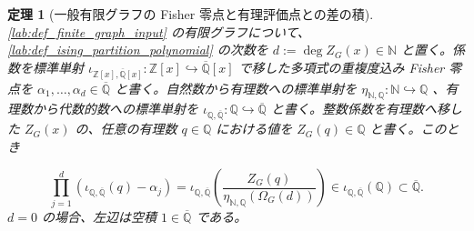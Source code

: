 \documentclass[11pt,a4paper]{article}
\newtheorem{theorem}[definition]{定理}
\theoremstyle{remark}
\begin{document}
\begin{theorem}[一般有限グラフの Fisher 零点と有理評価点との差の積]\label{lab:theorem_fisher_zero_rational_shifted_product_coefficient_ratio}
\cref{lab:def_finite_graph_input}
 の有限グラフについて、
\cref{lab:def_ising_partition_polynomial}
 の次数を
$d:=\deg Z_G(x)\in\mathbb N$
 と置く。係数を標準単射
$\iota_{\mathbb Z[x],\overline{\mathbb Q}[x]}:\mathbb Z[x]\hookrightarrow\overline{\mathbb Q}[x]$
 で移した多項式の重複度込み Fisher 零点を
$\alpha_1,\ldots,\alpha_d\in\overline{\mathbb Q}$
 と書く。自然数から有理数への標準単射を
$\eta_{\mathbb N,\mathbb Q}:\mathbb N\hookrightarrow\mathbb Q$
、有理数から代数的数への標準単射を
$\iota_{\mathbb Q,\overline{\mathbb Q}}:\mathbb Q\hookrightarrow\overline{\mathbb Q}$
 と書く。整数係数を有理数へ移した
$Z_G(x)$
 の、任意の有理数
$q\in\mathbb Q$
 における値を
$Z_G(q)\in\mathbb Q$
 と書く。このとき

\[\prod_{j=1}^{d}\left(\iota_{\mathbb Q,\overline{\mathbb Q}}(q)-\alpha_j\right)
=
\iota_{\mathbb Q,\overline{\mathbb Q}}\!\left(
  \frac{
    Z_G(q)
  }{
    \eta_{\mathbb N,\mathbb Q}(\Omega_G(d))
  }
\right)
\in\iota_{\mathbb Q,\overline{\mathbb Q}}(\mathbb Q)
\subset\overline{\mathbb Q}.\]
$d=0$
 の場合、左辺は空積
$1\in\overline{\mathbb Q}$
 である。

\end{theorem}
\end{document}
